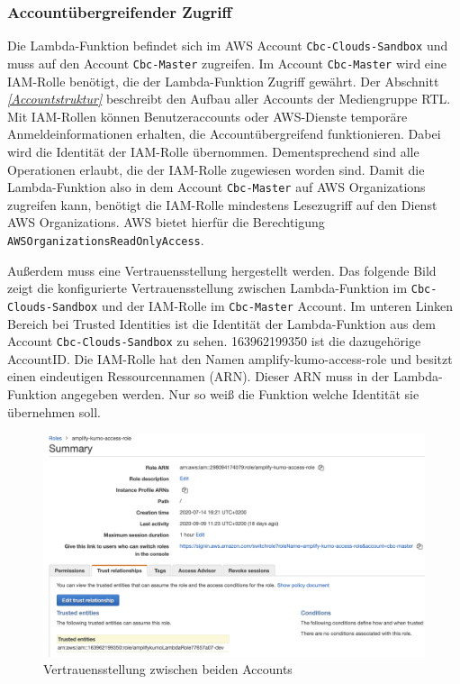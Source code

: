 \subsubsection{Accountübergreifender Zugriff}
\label{AccountübergreifenderZugriff}
Die Lambda-Funktion befindet sich im AWS Account \verb+Cbc-Clouds-Sandbox+ und muss auf den Account \verb+Cbc-Master+ zugreifen.
Im Account \verb+Cbc-Master+ wird eine IAM-Rolle benötigt, die der Lambda-Funktion Zugriff gewährt.
Der Abschnitt  \textit{\ref{Accountstruktur} } beschreibt den Aufbau aller Accounts der Mediengruppe RTL.
Mit IAM-Rollen können Benutzeraccounts oder AWS-Dienste temporäre Anmeldeinformationen erhalten, die Accountübergreifend funktionieren.
Dabei wird die Identität der IAM-Rolle übernommen.
Dementsprechend sind alle Operationen erlaubt, die der IAM-Rolle zugewiesen worden sind.
Damit die Lambda-Funktion also in dem Account \verb+Cbc-Master+ auf AWS Organizations zugreifen kann, benötigt die IAM-Rolle mindestens Lesezugriff auf den Dienst AWS Organizations.
AWS bietet hierfür die Berechtigung \verb+AWSOrganizationsReadOnlyAccess+.

Außerdem muss eine Vertrauensstellung hergestellt werden.
Das folgende Bild zeigt die konfigurierte Vertrauensstellung zwischen Lambda-Funktion im \verb+Cbc-Clouds-Sandbox+ und der IAM-Rolle im \verb+Cbc-Master+ Account.
Im unteren Linken Bereich bei \glqq Trusted Identities\grqq{} ist die Identität der Lambda-Funktion aus dem Account \verb+Cbc-Clouds-Sandbox+ zu sehen.
163962199350 ist die dazugehörige AccountID.
Die IAM-Rolle hat den Namen \grqq amplify-kumo-access-role\grqq{} und besitzt einen eindeutigen Ressourcennamen (ARN).
Dieser ARN muss in der Lambda-Funktion angegeben werden. Nur so weiß die Funktion welche Identität sie übernehmen soll.

\clearpage

\begin{figure}[htbp]
    \centering
    \includegraphics[width=1.0\textwidth]{50-Implementierung/IAM-Rolle.png}
    \caption{Vertrauensstellung zwischen beiden Accounts}
    \label{fig:meine-grafik}
\end{figure}



